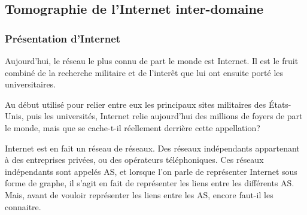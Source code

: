 
% 

\subsection{Tomographie de l'Internet inter-domaine}

\subsubsection{Pr\'esentation d'Internet}
\par
Aujourd'hui, le r\'eseau le plus connu de part le monde est Internet. Il est le fruit combin\'e de la recherche militaire et de l'inter\^et que lui ont ensuite port\'e les universitaires.
\par
Au d\'ebut utilis\'e pour relier entre eux les principaux sites militaires des \'Etats-Unis, puis les universit\'es, Internet relie aujourd'hui des millions de foyers de part le monde, mais que se cache-t-il r\'eellement derri\`ere cette appellation?
\par
Internet est en fait un r\'eseau de r\'eseaux. Des r\'eseaux ind\'ependants appartenant \`a des entreprises priv\'ees, ou des op\'erateurs t\'el\'ephoniques. Ces r\'eseaux ind\'ependants sont appel\'es AS, et lorsque l'on parle de repr\'esenter Internet sous forme de graphe, il s'agit en fait de repr\'esenter les liens entre les diff\'erents AS. Mais, avant de vouloir repr\'esenter les liens entre les AS, encore faut-il les connaitre.

